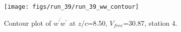 \begin{figure}[H]
\centering
\texttt{[image: figs/run\_39/run\_39\_ww\_contour]}
\caption{Contour plot of $\overline{w^\prime w^\prime}$ at $z/c$=8.50, $V_{free}$=30.87, station 4.}
\label{fig:run_39_ww_contour}
\end{figure}


